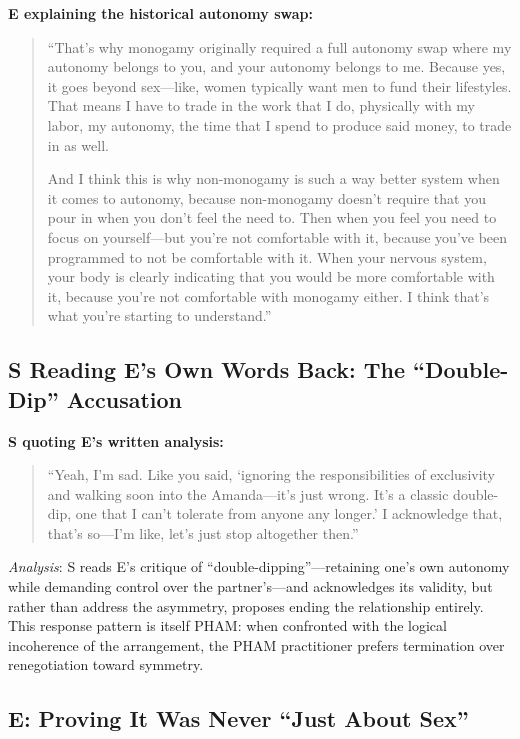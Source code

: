 \documentclass[12pt,openany]{book}
\numberwithin{equation}{chapter}
\begin{document}
\textbf{E explaining the historical autonomy swap:}
\begin{quote}
``That's why monogamy originally required a full autonomy swap where my autonomy belongs to you, and your autonomy belongs to me. Because yes, it goes beyond sex---like, women typically want men to fund their lifestyles. That means I have to trade in the work that I do, physically with my labor, my autonomy, the time that I spend to produce said money, to trade in as well.

And I think this is why non-monogamy is such a way better system when it comes to autonomy, because non-monogamy doesn't require that you pour in when you don't feel the need to. Then when you feel you need to focus on yourself---but you're not comfortable with it, because you've been programmed to not be comfortable with it. When your nervous system, your body is clearly indicating that you would be more comfortable with it, because you're not comfortable with monogamy either. I think that's what you're starting to understand.''
\end{quote}

\subsection{S Reading E's Own Words Back: The ``Double-Dip'' Accusation}

\textbf{S quoting E's written analysis:}
\begin{quote}
``Yeah, I'm sad. Like you said, `ignoring the responsibilities of exclusivity and walking soon into the Amanda---it's just wrong. It's a classic double-dip, one that I can't tolerate from anyone any longer.' I acknowledge that, that's so---I'm like, let's just stop altogether then.''
\end{quote}

\textit{Analysis}: S reads E's critique of ``double-dipping''---retaining one's own autonomy while demanding control over the partner's---and acknowledges its validity, but rather than address the asymmetry, proposes ending the relationship entirely. This response pattern is itself PHAM: when confronted with the logical incoherence of the arrangement, the PHAM practitioner prefers termination over renegotiation toward symmetry.

\subsection{E: Proving It Was Never ``Just About Sex''}
\end{document}
